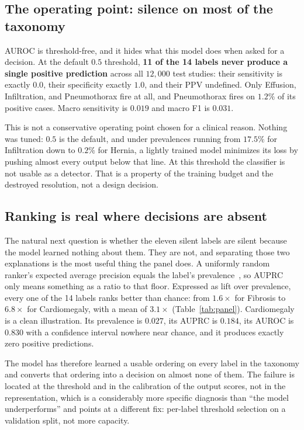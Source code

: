 \documentclass[10pt,twocolumn]{article}
\begin{document}
\subsection{The operating point: silence on most of the taxonomy}
\label{sec:operating}
AUROC is threshold-free, and it hides what this model does when asked for a
decision. At the default $0.5$ threshold, \textbf{11 of the 14 labels never
produce a single positive prediction} across all $12{,}000$ test studies: their
sensitivity is exactly $0.0$, their specificity exactly $1.0$, and their PPV
undefined. Only Effusion, Infiltration, and Pneumothorax fire at all, and
Pneumothorax fires on $1.2\%$ of its positive cases. Macro sensitivity is $0.019$
and macro F1 is $0.031$.

This is not a conservative operating point chosen for a clinical reason. Nothing
was tuned: $0.5$ is the default, and under prevalences running from $17.5\%$ for
Infiltration down to $0.2\%$ for Hernia, a lightly trained model minimizes its
loss by pushing almost every output below that line. At this threshold the
classifier is not usable as a detector. That is a property of the training budget
and the destroyed resolution, not a design decision.

\subsection{Ranking is real where decisions are absent}
\label{sec:auprc}
The natural next question is whether the eleven silent labels are silent because
the model learned nothing about them. They are not, and separating those two
explanations is the most useful thing the panel does. A uniformly random ranker's
expected average precision equals the label's
prevalence~\cite{davis2006pr,saito2015prc}, so AUPRC only means
something as a ratio to that floor. Expressed as lift over prevalence, every one
of the 14 labels ranks better than chance: from $1.6\times$ for Fibrosis to
$6.8\times$ for Cardiomegaly, with a mean of $3.1\times$
(Table~\ref{tab:panel}). Cardiomegaly is a clean illustration. Its prevalence is
$0.027$, its AUPRC is $0.184$, its AUROC is $0.830$ with a confidence interval
nowhere near chance, and it produces exactly zero positive predictions.

The model has therefore learned a usable ordering on every label in the taxonomy
and converts that ordering into a decision on almost none of them. The failure is
located at the threshold and in the calibration of the output scores, not in the
representation, which is a considerably more specific diagnosis than ``the model
underperforms'' and points at a different fix: per-label threshold selection on a
validation split, not more capacity.
\end{document}
